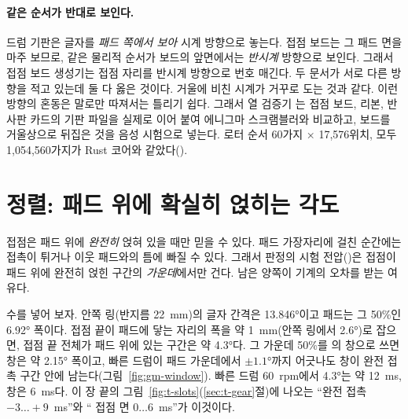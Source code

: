 \paragraph{같은 순서가 반대로 보인다.} 드럼 기판은 글자를 \emph{패드 쪽에서 보아} 시계 방향으로 놓는다. 접점
보드는 그 패드 면을 마주 보므로, 같은 물리적 순서가 보드의 앞면에서는 \emph{반시계} 방향으로 보인다. 그래서 접점
보드 생성기는 접점 자리를 반시계 방향으로 번호 매긴다. 두 문서가 서로 다른 방향을 적고 있는데 둘 다 옳은 것이다.
거울에 비친 시계가 거꾸로 도는 것과 같다. 이런 방향의 혼동은 말로만 따져서는 틀리기 쉽다. 그래서 열 검증기
는 접점 보드, 리본, 반사판 카드의 기판 파일을 실제로 이어 붙여 에니그마 스크램블러와 비교하고,
보드를 거울상으로 뒤집은 것을 음성 시험으로 넣는다. 로터 순서 60가지 × 17,576위치, 모두 1,054,560가지가 Rust 코어와
같았다().

\section{정렬: 패드 위에 확실히 얹히는 각도}\label{sec:gm-align}

\Why 접점은 패드 위에 \emph{완전히} 얹혀 있을 때만 믿을 수 있다. 패드 가장자리에 걸친 순간에는 접촉이 튀거나
이웃 패드와의 틈에 빠질 수 있다. 그래서 판정의 시험 전압()은 접점이 패드 위에 완전히 얹힌 구간의
\emph{가운데}에서만 건다. 남은 양쪽이 기계의 오차를 받는 여유다.

수를 넣어 보자. 안쪽 링(반지름 22~mm)의 글자 간격은 13.846°이고 패드는 그 50\%인 6.92° 폭이다. 접점 끝이 패드에
닿는 자리의 폭을 약 1~mm(안쪽 링에서 2.6°)로 잡으면, 접점 끝 전체가 패드 위에 있는 
구간은 약 4.3°다. 그 가운데 50\%를 의 창으로 쓰면 창은 약 2.15° 폭이고, 빠른 드럼이 패드 가운데에서
$\pm 1.1°$까지 어긋나도 창이 완전 접촉 구간 안에 남는다(그림~\ref{fig:gm-window}). 빠른 드럼 60~rpm에서 4.3°는
약 12~ms, 창은 6~ms다. 이 장 끝의 그림~\ref{fig:t-slots}(\ref{sec:t-gear}절)에 나오는 ``완전 접촉 $-3 \ldots +9$~ms''와 `` 접점 면
$0 \ldots 6$~ms''가 이것이다.

